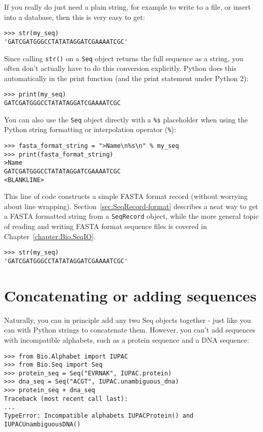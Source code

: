 \documentclass{report}
\begin{document}
If you really do just need a plain string, for example to write to a file, or insert into a database, then this is very easy to get:
\begin{verbatim}
>>> str(my_seq)
'GATCGATGGGCCTATATAGGATCGAAAATCGC'
\end{verbatim}

Since calling \verb|str()| on a \verb|Seq| object returns the full sequence as a string,
you often don't actually have to do this conversion explicitly.
Python does this automatically in the print function
(and the print statement under Python 2):
\begin{verbatim}
>>> print(my_seq)
GATCGATGGGCCTATATAGGATCGAAAATCGC
\end{verbatim}

You can also use the \verb|Seq| object directly with a \verb|%s| placeholder when using the Python string formatting or interpolation operator (\verb|%|):
\begin{verbatim}
>>> fasta_format_string = ">Name\n%s\n" % my_seq
>>> print(fasta_format_string)
>Name
GATCGATGGGCCTATATAGGATCGAAAATCGC
<BLANKLINE>
\end{verbatim}

\noindent This line of code constructs a simple FASTA format record (without worrying about line wrapping).
Section~\ref{sec:SeqRecord-format} describes a neat way to get a FASTA formatted
string from a \verb|SeqRecord| object, while the more general topic of reading and
writing FASTA format sequence files is covered in Chapter~\ref{chapter:Bio.SeqIO}.

\begin{verbatim}
>>> str(my_seq)
'GATCGATGGGCCTATATAGGATCGAAAATCGC'
\end{verbatim}

\section{Concatenating or adding sequences}

Naturally, you can in principle add any two Seq objects together - just like you can with Python strings to concatenate them.  However, you can't add sequences with incompatible alphabets, such as a protein sequence and a DNA sequence:

\begin{verbatim}
>>> from Bio.Alphabet import IUPAC
>>> from Bio.Seq import Seq
>>> protein_seq = Seq("EVRNAK", IUPAC.protein)
>>> dna_seq = Seq("ACGT", IUPAC.unambiguous_dna)
>>> protein_seq + dna_seq
Traceback (most recent call last):
...
TypeError: Incompatible alphabets IUPACProtein() and IUPACUnambiguousDNA()
\end{verbatim}
\end{document}
